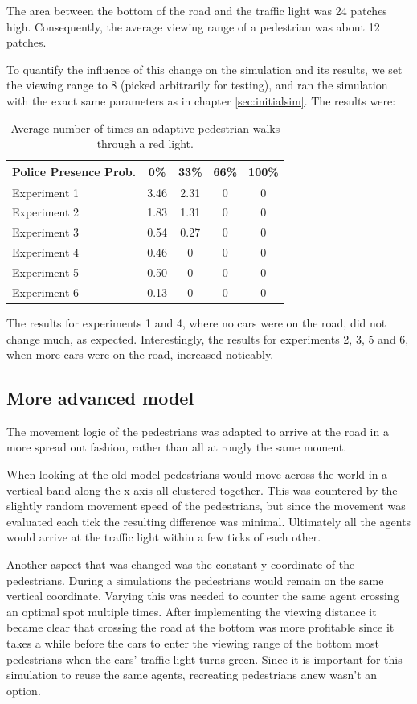 \documentclass[a4paper]{article}
\begin{document}
The area between the bottom of the road and the traffic light was 24 patches high. Consequently, the average viewing range of a pedestrian was about 12 patches.

To quantify the influence of this change on the simulation and its results, we set the viewing range to 8 (picked arbitrarily for testing), and ran the simulation with the exact same parameters as in chapter \ref{sec:initialsim}. The results were:

\begin{table}[H]
\centering
\begin{tabular}{ l | c c c c }
  Police Presence Prob. & 0\% & 33\% & 66\% & 100\% \\ 
  \hline
  Experiment 1 & 3.46 & 2.31 & 0 & 0  \\
  Experiment 2 & 1.83 & 1.31 & 0 & 0  \\
  Experiment 3 & 0.54 & 0.27 & 0 & 0  \\
  Experiment 4 & 0.46 & 0    & 0 & 0  \\
  Experiment 5 & 0.50 & 0    & 0 & 0  \\
  Experiment 6 & 0.13 & 0    & 0 & 0  \\
\end{tabular}
\caption{Average number of times an adaptive 
pedestrian walks through a red light.}
\end{table}

The results for experiments 1 and 4, where no cars were on the road, did not change much, as expected. Interestingly, the results for experiments 2, 3, 5 and 6, when more cars were on the road, increased noticably. 

\subsection{More advanced model}
The movement logic of the pedestrians was adapted to arrive at the road in a more spread out fashion, rather than all at rougly the same moment.

When looking at the old model pedestrians would move across the world in a vertical band along the x-axis all clustered together. This was countered by the slightly random movement speed of the pedestrians, but since the movement was evaluated each tick the resulting difference was minimal. Ultimately all the agents would arrive at the traffic light within a few ticks of each other.

Another aspect that was changed was the constant y-coordinate of the pedestrians. During a simulations the pedestrians would remain on the same vertical coordinate. Varying this was needed to counter the same agent crossing an optimal spot multiple times. After implementing the viewing distance it became clear that crossing the road at the bottom was more profitable since it takes a while before the cars to enter the viewing range of the bottom most pedestrians when the cars' traffic light turns green.
Since it is important for this simulation to reuse the same agents, recreating pedestrians anew wasn't an option.
\end{document}

